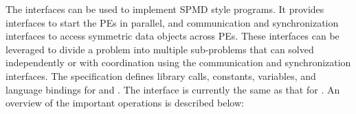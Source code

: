 

The \openshmem{} interfaces can be used to implement \ac{SPMD} style programs. It provides interfaces 
to start the \openshmem{} \ac{PE}s in parallel, and communication and synchronization interfaces to access symmetric data objects across \ac{PE}s. These interfaces can be leveraged to divide a problem into multiple sub-problems that can solved independently or with coordination using the communication and synchronization interfaces.
The \openshmem specification defines library calls, constants, variables, and language bindings for \Clang{} and \Fortran{}.
The \Cpp{} interface is currently the same as that for \Clang. An overview of the important \openshmem operations is described below:

